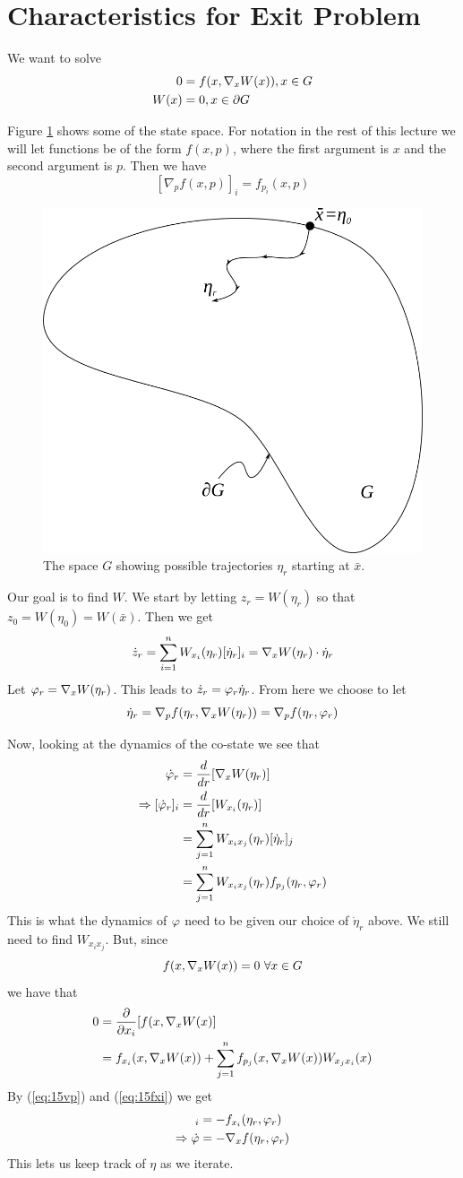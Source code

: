 \section{Characteristics for Exit Problem}
We want to solve
\begin{align*}
0 &= f(x,\nabla_xW(x)), x\in G \\
W(x) &= 0, x\in\partial G
\end{align*}

Figure \ref{fig:15g} shows some of the state space. For notation in the rest of this lecture we will let functions be of the form $f(x,p)$, where the first argument is $x$ and the second argument is $p$. Then we have
$$[\nabla_pf(x,p)]_i = f_{p_i}(x,p)$$

\begin{figure}[ht!]
	\centering
	\includegraphics[width=.15\textwidth]{images/15g}
	\caption{The space $G$ showing possible trajectories $\eta_r$ starting at $\bar{x}$.}
	\label{fig:15g}
\end{figure}

Our goal is to find $W$. We start by letting $z_r=W(\eta_r)$ so that $z_0=W(\eta_0)=W(\bar{x})$. Then we get
$$\dot{z}_r = \sum_{i=1}^n W_{x_i}(\eta_r)[\dot{\eta}_r]_i = \nabla_xW(\eta_r)\cdot \dot{\eta}_r$$
Let $\varphi_r=\nabla_xW(\eta_r)$. This leads to $\dot{z}_r=\varphi_r\dot{\eta}_r$. From here we choose to let
$$\dot{\eta}_r = \nabla_pf(\eta_r,\nabla_xW(\eta_r)) = \nabla_pf(\eta_r,\varphi_r)$$

Now, looking at the dynamics of the co-state we see that
\begin{align}
\label{eq:15vp}
\dot{\varphi}_r &= \frac{d}{dr}[\nabla_xW(\eta_r)] \nonumber \\
\Rightarrow [\dot{\varphi}_r]_i &= \frac{d}{dr}[W_{x_i}(\eta_r)] \nonumber \\
&= \sum_{j=1}^nW_{x_ix_j}(\eta_r)[\dot{\eta}_r]_j \nonumber \\
&= \sum_{j=1}^nW_{x_ix_j}(\eta_r)f_{p_j}(\eta_r,\varphi_r)
\end{align}
This is what the dynamics of $\varphi$ need to be given our choice of $\dot{\eta}_r$ above. We still need to find $W_{x_ix_j}$. But, since
$$f(x,\nabla_xW(x)) = 0 ~\forall x\in G$$
we have that
\begin{align}
\label{eq:15fxi}
0 &= \frac{\partial}{\partial x_i}[f(x,\nabla_xW(x)] \nonumber \\
&= f_{x_i}(x,\nabla_xW(x)) + \sum_{j=1}^nf_{p_j}(x,\nabla_xW(x))W_{x_jx_i}(x)
\end{align}
By (\ref{eq:15vp}) and (\ref{eq:15fxi}) we get
\begin{align*}
[\dot{\vp}_r]_i &= -f_{x_i}(\eta_r,\vp_r) \\
\Rightarrow \dot{\vp} &= -\nabla_xf(\eta_r,\vp_r)
\end{align*}
This lets us keep track of $\eta$ as we iterate.

